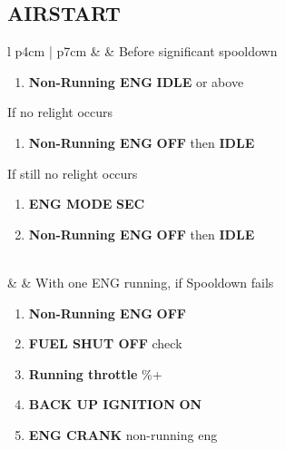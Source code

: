 \documentclass[8pt,usenames,dvipsnames,twoside]{article}
\begin{document}
		\clearpage
		
		\subsection{AIRSTART}
		\begin{center}
			\begin{longtable}{l p{4cm} | p{7cm}}
				\toprule
				\textbullet &  & Before significant spooldown
				\begin{minipage}[t]{\linewidth}
					\vspace{-7pt}
					\begin{enumerate}[label=(\alph*)]
						\item \textbf{Non-Running ENG} \dotfill \textbf{IDLE} or above
					\end{enumerate}
					If no relight occurs
					\begin{enumerate}[label=(\alph*), resume]
						\vspace{-7pt}
						\item \textbf{Non-Running ENG} \dotfill \textbf{OFF} then \textbf{IDLE}
					\end{enumerate}
					\vspace{-7pt}
					If still no relight occurs
					\begin{enumerate}[label=(\alph*), resume]
						\vspace{-7pt}
						\item \textbf{ENG MODE} \dotfill \textbf{SEC}
						\item \textbf{Non-Running ENG} \dotfill \textbf{OFF} then \textbf{IDLE}
					\end{enumerate}
				\end{minipage} \\
				\midrule
				\textbullet &  & 
				With one ENG running, if Spooldown fails
				\begin{minipage}[t]{\linewidth}
					\vspace{-7pt}
					\begin{enumerate}[label=(\alph*)]
						\item \textbf{Non-Running ENG} \dotfill \textbf{OFF}
						\item \textbf{FUEL SHUT OFF} \dotfill check
						\item \textbf{Running throttle} \%+
						\item \textbf{BACK UP IGNITION} \dotfill \textbf{ON}
						\item \textbf{ENG CRANK} \dotfill non-running eng

\end{enumerate}
\end{minipage}
\end{longtable}
\end{center}
\end{document}
